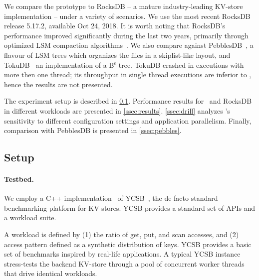 We  compare the \sys\/ prototype to RocksDB -- a mature industry-leading KV-store implementation  -- under a variety of scenarios.  We use the most recent RocksDB release 5.17.2, available Oct 24, 2018.  
It is worth noting that RocksDB's performance improved significantly during the last two years, primarily through 
optimized LSM compaction algorithms~\cite{CallaghanCompaction}.   We also compare against PebblesDB~\cite{PebblesDB}, a flavour of LSM trees which organizes the files in a skiplist-like layout, and TokuDB~\cite{TokuDB} an implementation of a B$^\epsilon$ tree. TokuDB crashed in executions with more then one thread; its throughput in single thread executions are inferior to \sys, hence the results are not presented. 

The experiment setup is described in \cref{ssec:setup}. 
Performance results for \sys\ and RocksDB in 
different workloads are presented in \cref{ssec:results}. 
\cref{ssec:drill} analyzes \sys's sensitivity to different configuration settings and application parallelism. Finally, comparison with PebblesDB is presented in \cref{ssec:pebbles}.
 

\subsection{Setup}
\label{ssec:setup} 

\paragraph{Testbed.} We employ a C++ implementation~\cite{Cpp-YCSB} of YCSB~\cite{YCSB}, the  de facto standard  
benchmarking platform for KV-stores. 
YCSB provides a standard set of APIs and a workload suite. 

A workload is defined by  (1) the ratio of get, put, and scan accesses, and (2) access pattern defined as a synthetic distribution of keys. 
YCSB provides a basic set of benchmarks  inspired by real-life applications.
A typical YCSB instance stress-tests the backend KV-store through a pool of concurrent worker threads that drive identical
workloads. %

